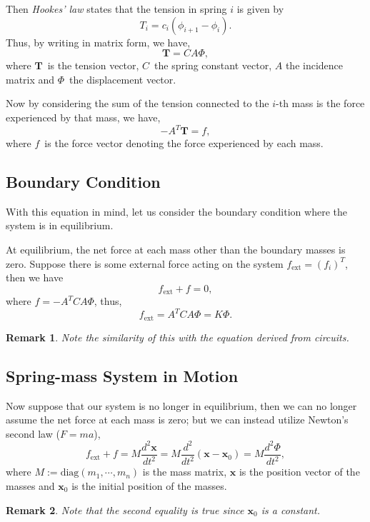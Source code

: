 \documentclass[]{article}
\newtheorem*{remark}{Remark}
\begin{document}
Then \emph{Hookes' law} states that the tension in spring \(i\) is given
by \[T_i = c_i (\phi_{i+1} - \phi_i). \] Thus, by writing in matrix
form, we have, \[\mathbf{T} = C A \Phi,\] where \(\mathbf{T}\)~is the
tension vector, \(C\)~the spring constant vector, \(A\) the incidence
matrix and \(\Phi\)~the displacement vector.

Now by considering the sum of the tension connected to the \(i\)-th mass
is the force experienced by that mass, we have,
\[- A^T \mathbf{T} = f,\] where \(f\)~is the force vector denoting the
force experienced by each mass.

\subsection{Boundary Condition}\label{boundary-condition}

With this equation in mind, let us consider the boundary condition where
the system is in equilibrium.

At equilibrium, the net force at each mass other than the boundary
masses is zero. Suppose there is some external force acting on the
system \(f_{\text{ext}} = (f_i)^T\), then we have
\[ f_{\text{ext}} + f = 0,\] where \(f = -A^TCA \Phi\), thus,
\[f_{\text{ext}} = A^T CA \Phi = K\Phi.\]

\begin{remark}
Note the similarity of this with the equation derived from circuits.
\end{remark}

\subsection{Spring-mass System in
Motion}\label{spring-mass-system-in-motion}

Now suppose that our system is no longer in equilibrium, then we can no
longer assume the net force at each mass is zero; but we can instead
utilize Newton's second law (\(F = ma\)), \[
f_{\text{ext}} + f = M \frac{d^2\mathbf{x}}{dt^2} = M \frac{d^2}{dt^2}(\mathbf{x} - \mathbf{x}_0) = M \frac{d^2\Phi}{dt^2},
\] where \(M := \text{diag}(m_1, \cdots, m_n)\) is the mass matrix,
\(\mathbf{x}\) is the position vector of the masses and \(\mathbf{x}_0\)
is the initial position of the masses.

\begin{remark}
Note that the second equality is true since $\mathbf{x}_0$ is a constant.
\end{remark}
\end{document}
